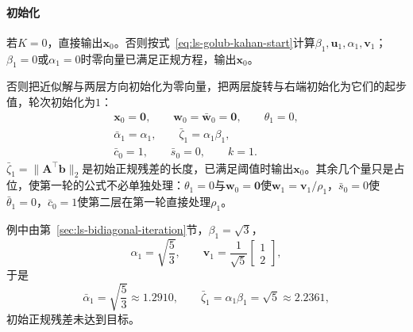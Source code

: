 \paragraph{初始化}
若$K=0$，直接输出$\bm x_0$。否则按式~\eqref{eq:ls-golub-kahan-start}计算$\beta_1,\bm u_1,\alpha_1,\bm v_1$；$\beta_1=0$或$\alpha_1=0$时零向量已满足正规方程，输出$\bm x_0$。

否则把近似解与两层方向初始化为零向量，把两层旋转与右端初始化为它们的起步值，轮次初始化为$1$：
\[
 \begin{gathered}
 \bm x_0=\bm0,\qquad \bm w_0=\bar{\bm w}_0=\bm0,\qquad \theta_1=0,\\
 \bar\alpha_1=\alpha_1,\qquad \bar\zeta_1=\alpha_1\beta_1,\\
 \bar c_0=1,\qquad \bar s_0=0,\qquad k=1 .
 \end{gathered}
\]
$\bar\zeta_1=\lVert\bm A^\top\bm b\rVert_2$是初始正规残差的长度，已满足阈值时输出$\bm x_0$。其余几个量只是占位，使第一轮的公式不必单独处理：$\theta_1=0$与$\bm w_0=\bm0$使$\bm w_1=\bm v_1/\rho_1$，$\bar s_0=0$使$\bar\theta_1=0$，$\bar c_0=1$使第二层在第一轮直接处理$\rho_1$。

例中由第~\ref{sec:ls-bidiagonal-iteration}节，$\beta_1=\sqrt3$，
\[
 \alpha_1=\sqrt{\frac53},\qquad \bm v_1=\frac1{\sqrt5}\begin{bmatrix}1\\2\end{bmatrix},
\]
于是
\[
 \bar\alpha_1=\sqrt{\frac53}\approx1.2910,\qquad \bar\zeta_1=\alpha_1\beta_1=\sqrt5\approx2.2361 ,
\]
初始正规残差未达到目标。

